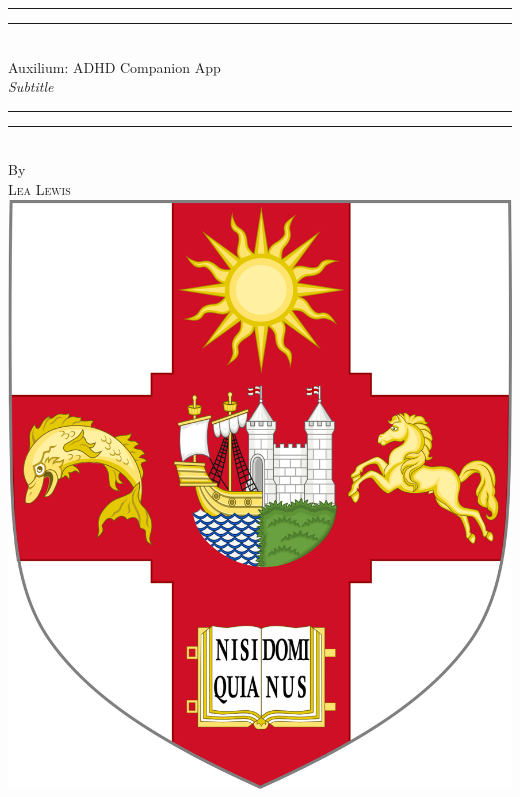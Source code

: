 \documentclass[11pt,a4paper]{article}
\numberwithin{figure}{section}
\begin{document}

   \begin{center}
      \rule[0.5ex]{\linewidth}{2pt}\vspace*{-\baselineskip}\vspace*{3.2pt}
      \rule[0.5ex]{\linewidth}{1pt}\\[\baselineskip]
      {\Huge Auxilium: ADHD Companion App} \\[4mm]
      {\Large \textit{Subtitle}} \\
      \rule[0.5ex]{\linewidth}{1pt}\vspace*{-\baselineskip}\vspace{3.2pt}
      \rule[0.5ex]{\linewidth}{2pt} \\ 
      \vspace{6.5mm}
      {\large By} \\
      \vspace{6.5mm}
      {\large\textsc{Lea Lewis}} \\
      \vspace{11mm}
      \includegraphics[scale=0.07]{crest.png} \\

\end{center}
\end{document}
